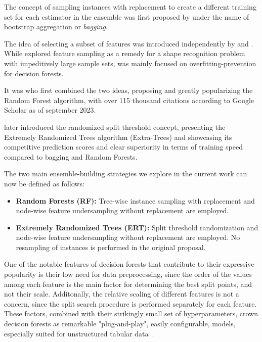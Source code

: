 The concept of sampling instances with replacement to create a different training set for each estimator in the ensemble was first proposed by \textcite{breiman1996bagging} under the name of bootstrap aggregation or \emph{bagging}.

The idea of selecting a subset of features was introduced independently by \textcite{amit1997shape} and \textcite{tinkamho1998random}. While \textcite{amit1997shape} explored feature sampling as a remedy for a shape recognition problem with impeditively large sample sets, \textcite{tinkamho1998random} was mainly focused on overfitting-prevention for decision forests.

It was \textcite{breiman2001random} who first combined the two ideas, proposing and greatly popularizing the Random Forest algorithm, with over 115 thousand citations according to Google Scholar as of september 2023.

\textcite{geurts2006extremely} later introduced the randomized split threshold concept, presenting the Extremely Randomized Trees algorithm (Extra-Trees) and showcasing its competitive prediction scores and clear superiority in terms of training speed compared to bagging and Random Forests.

The two main ensemble-building strategies we explore in the current work can now be defined as follows:

\begin{itemize}
    \item \textbf{Random Forests (RF):} Tree-wise instance sampling with replacement and node-wise feature undersampling without replacement are employed.
    \item \textbf{Extremely Randomized Trees (ERT):} Split threshold randomization and node-wise feature undersampling without replacement are employed. No resampling of instances is performed in the original proposal.
\end{itemize}

One of the notable features of decision forests that contribute to their expressive popularity is their low need for data preprocessing, since the order of the values among each feature is the main factor for determining the best split points, and not their scale. Additonally, the relative scaling of different features is not a concern, since the split search procedure is performed separately for each feature. These factors, combined with their strikingly small set of hyperparameters, crown decision forests as remarkable "plug-and-play", easily configurable, models, especially suited for unstructured tabular data~\cite{breiman2001}. %

